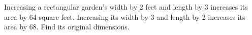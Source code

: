 Increasing a rectangular garden's width by 2 feet and length by 3 increases its area by 64 square feet. Increasing its width by 3 and length by 2 increases its area by 68. Find its original dimensions.
